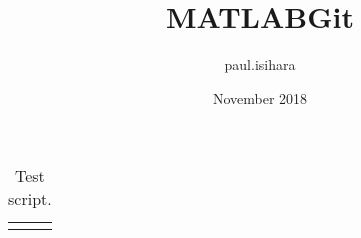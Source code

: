 \documentclass{article}
\title{MATLABGit}
\author{paul.isihara }
\date{November 2018}
\begin{document}
\maketitle

\begin{table}[!htpb]
\centering
\begin{tabular}{|l|}\hline
\parbox[b]{6.5in}{}\\\hline
\end{tabular}
\caption{Test script. }
\label{Table1}
\end{table}
\end{document}
